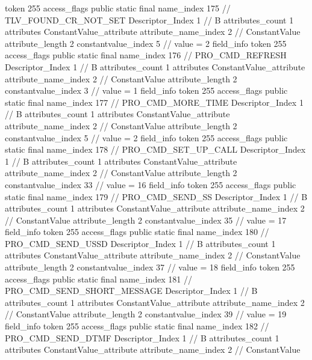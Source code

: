 {{{{{				token	255
				access_flags	public static final
				name_index	175		// TLV_FOUND_CR_NOT_SET
				Descriptor_Index	1		// B
				attributes_count	1
				attributes {
				ConstantValue_attribute {
					attribute_name_index	2		// ConstantValue
					attribute_length	2
					constantvalue_index	5		// value = 2
				}
				}
			}
			field_info {
				token	255
				access_flags	public static final
				name_index	176		// PRO_CMD_REFRESH
				Descriptor_Index	1		// B
				attributes_count	1
				attributes {
				ConstantValue_attribute {
					attribute_name_index	2		// ConstantValue
					attribute_length	2
					constantvalue_index	3		// value = 1
				}
				}
			}
			field_info {
				token	255
				access_flags	public static final
				name_index	177		// PRO_CMD_MORE_TIME
				Descriptor_Index	1		// B
				attributes_count	1
				attributes {
				ConstantValue_attribute {
					attribute_name_index	2		// ConstantValue
					attribute_length	2
					constantvalue_index	5		// value = 2
				}
				}
			}
			field_info {
				token	255
				access_flags	public static final
				name_index	178		// PRO_CMD_SET_UP_CALL
				Descriptor_Index	1		// B
				attributes_count	1
				attributes {
				ConstantValue_attribute {
					attribute_name_index	2		// ConstantValue
					attribute_length	2
					constantvalue_index	33		// value = 16
				}
				}
			}
			field_info {
				token	255
				access_flags	public static final
				name_index	179		// PRO_CMD_SEND_SS
				Descriptor_Index	1		// B
				attributes_count	1
				attributes {
				ConstantValue_attribute {
					attribute_name_index	2		// ConstantValue
					attribute_length	2
					constantvalue_index	35		// value = 17
				}
				}
			}
			field_info {
				token	255
				access_flags	public static final
				name_index	180		// PRO_CMD_SEND_USSD
				Descriptor_Index	1		// B
				attributes_count	1
				attributes {
				ConstantValue_attribute {
					attribute_name_index	2		// ConstantValue
					attribute_length	2
					constantvalue_index	37		// value = 18
				}
				}
			}
			field_info {
				token	255
				access_flags	public static final
				name_index	181		// PRO_CMD_SEND_SHORT_MESSAGE
				Descriptor_Index	1		// B
				attributes_count	1
				attributes {
				ConstantValue_attribute {
					attribute_name_index	2		// ConstantValue
					attribute_length	2
					constantvalue_index	39		// value = 19
				}
				}
			}
			field_info {
				token	255
				access_flags	public static final
				name_index	182		// PRO_CMD_SEND_DTMF
				Descriptor_Index	1		// B
				attributes_count	1
				attributes {
				ConstantValue_attribute {
					attribute_name_index	2		// ConstantValue
}}}}}}}
